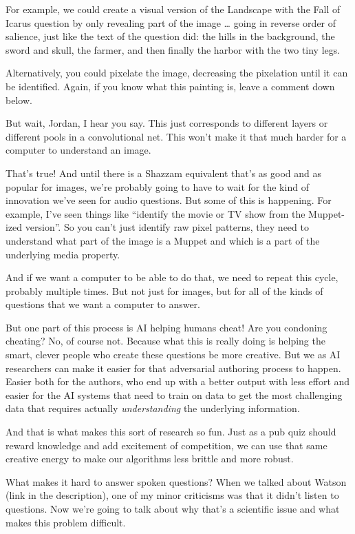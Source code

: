 For example, we could create a visual version of the Landscape with the Fall of Icarus question by only revealing part of the image … going in reverse order of salience, just like the text of the question did: the hills in the background, the sword and skull, the farmer, and then finally the harbor with the two tiny legs.  

Alternatively, you could pixelate the image, decreasing the pixelation until it can be identified.  Again, if you know what this painting is, leave a comment down below.

But wait, Jordan, I hear you say.  This just  corresponds to different layers or different pools in a convolutional net.  This won’t make it that much harder for a computer to understand an image.  

That’s true!  And until there is a Shazzam equivalent that’s as good and as popular for images, we’re probably going to have to wait for the kind of innovation we’ve seen for audio questions.  But some of this is happening.  For example, I’ve seen things like “identify the movie or TV show from the Muppet-ized version”.  So you can’t just identify raw pixel patterns, they need to understand what part of the image is a Muppet and which is a part of the underlying media property.  

And if we want a computer to be able to do that, we need to repeat this cycle, probably multiple times.  But not just for images, but for all of the kinds of questions that we want a computer to answer.  

But one part of this process is AI helping humans cheat!  Are you condoning cheating?  No, of course not.  Because what this is really doing is helping the smart, clever people who create these questions be more creative.  But we as AI researchers can make it easier for that adversarial authoring process to happen.  Easier both for the authors, who end up with a better output with less effort and easier for the AI systems that need to train on data to get the most challenging data that requires actually \emph{understanding} the underlying information.

And that is what makes this sort of research so fun.  Just as a pub quiz should reward knowledge and add excitement of competition, we can use that same creative energy to make our algorithms less brittle and more robust.  

What makes it hard to answer spoken questions?  
When we talked about Watson (link in the description), one of my minor criticisms was that it didn’t listen to questions.  Now we’re going to talk about why that’s a scientific issue and what makes this problem difficult.

